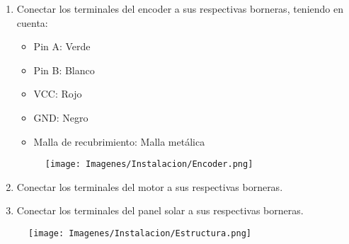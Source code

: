         \begin{enumerate}
            \item Conectar los terminales del encoder a sus respectivas borneras, teniendo en cuenta:

            \begin{itemize} [label=-]
                \item Pin A: Verde
                \item Pin B: Blanco
                \item VCC: Rojo
                \item GND: Negro
                \item Malla de recubrimiento: Malla metálica
            \end{itemize}

            \begin{figure} [H]
                \centering
                \texttt{[image: Imagenes/Instalacion/Encoder.png]}
            \end{figure}
            
            \item Conectar los terminales del motor a sus respectivas borneras.
            \item Conectar los terminales del panel solar a sus respectivas borneras.

        \end{enumerate}

        \begin{figure}
            \centering
            \texttt{[image: Imagenes/Instalacion/Estructura.png]}
        \end{figure}